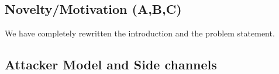 \documentclass[9pt]{article}
\begin{document}
\subsection{Novelty/Motivation (A,B,C)}

{\color{blue} We have completely rewritten the introduction and the problem statement. }


\subsection{Attacker Model and Side channels}
\end{document}
